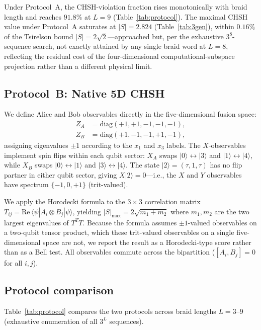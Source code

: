 \documentclass[aps,pra,twocolumn,superscriptaddress,longbibliography,floatfix,nofootinbib]{revtex4-2}
\begin{document}
Under Protocol~A, the CHSH-violation fraction rises monotonically
with braid length and reaches $91.8\%$ at $L=9$
(Table~\ref{tab:protocol}).
The maximal CHSH value under Protocol~A saturates at $|S|=2.824$
(Table~\ref{tab:3gen}), within $0.16\%$ of the Tsirelson bound
$|S|=2\sqrt{2}$---approached but, per the exhaustive $3^8$-sequence
search, not exactly attained by any single braid word at $L=8$,
reflecting the residual cost of the four-dimensional
computational-subspace projection rather than a different physical
limit.

\subsection{Protocol~B: Native 5D CHSH}

We define Alice and Bob observables directly in the five-dimensional
fusion space:
\begin{align}
Z_A &= \text{diag}(+1,+1,-1,-1,-1), \label{eq:ZA} \\
Z_B &= \text{diag}(+1,-1,-1,+1,-1), \label{eq:ZB}
\end{align}
assigning eigenvalues $\pm 1$ according to the $x_1$ and $x_3$ labels.
The $X$-observables implement spin flips within each qubit sector:
$X_A$ swaps $|0\rangle\leftrightarrow|3\rangle$ and
$|1\rangle\leftrightarrow|4\rangle$, while $X_B$ swaps
$|0\rangle\leftrightarrow|1\rangle$ and
$|3\rangle\leftrightarrow|4\rangle$.
The state $|2\rangle = (\tau,1,\tau)$ has no flip partner in either
qubit sector, giving $X|2\rangle = 0$---i.e., the $X$ and $Y$
observables have spectrum $\{-1,0,+1\}$ (trit-valued).

We apply the Horodecki formula to the $3\times 3$ correlation matrix
$T_{ij} = \text{Re}\,\langle\psi|A_i \otimes B_j|\psi\rangle$,
yielding $|S|_{\max} = 2\sqrt{m_1+m_2}$ where $m_1,m_2$ are the
two largest eigenvalues of $T^T T$. Because the formula assumes
$\pm1$-valued observables on a two-qubit tensor product, which these
trit-valued observables on a single five-dimensional space are not, we
report the result as a Horodecki-type score rather than as a Bell test.
All observables commute across the bipartition ($[A_i,B_j]=0$ for all
$i,j$).

\subsection{Protocol comparison}

Table~\ref{tab:protocol} compares the two protocols across braid
lengths $L=3$--$9$ (exhaustive enumeration of all $3^L$ sequences).
\end{document}
